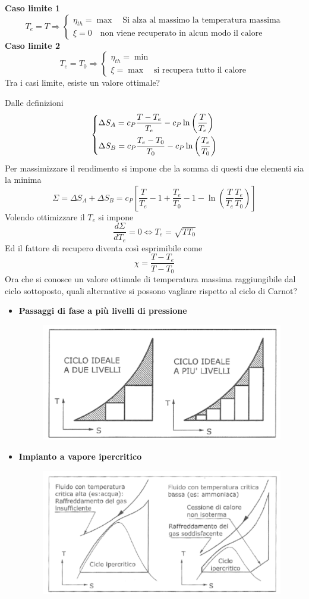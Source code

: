 \begin{adjustwidth}{2in}{}
	\textbf{Caso limite 1}
	\[
		T_e = T \Rightarrow \begin{cases}
			\eta_{th} = \max\quad\text{Si alza al massimo la temperatura massima} \\
			\xi = 0 \quad\text{non viene recuperato in alcun modo il calore}
		\end{cases}
	\]
	\textbf{Caso limite 2}
	\[
	T_e = T_0 \Rightarrow \begin{cases}
		\eta_{th} = \min \\
		\xi = \max \quad\text{si recupera tutto il calore}
	\end{cases}
	\]
	Tra i casi limite, esiste un valore ottimale?
	
	Dalle definizioni 
	\[\begin{dcases}
		\Delta S_A = c_P\dfrac{T-T_e}{T_e} - c_P\ln\left(\dfrac{T}{T_e}\right) \\
		\Delta S_B = c_P\dfrac{T_e-T_0}{T_0} - c_P\ln\left(\dfrac{T_e}{T_0}\right)
	\end{dcases}\]
	Per massimizzare il rendimento si impone che la somma di questi due elementi sia la minima
	\[\Sigma = \Delta S_A + \Delta S_B = c_P\left[\dfrac{T}{T_e} - 1 + \dfrac{T_e}{T_0} - 1 - \ln\left(\dfrac{T}{T_e}\dfrac{T_e}{T_0}\right)\right]\]
	Volendo ottimizzare il $T_e$ si impone 
	\[\dfrac{d\Sigma}{dT_e} = 0 \Leftrightarrow T_e = \sqrt{TT_0}\]
	Ed il fattore di recupero diventa così esprimibile come 
	\[\chi = \dfrac{T-T_e}{T-T_0}\]
	Ora che si conosce un valore ottimale di temperatura massima raggiungibile dal ciclo sottoposto, quali alternative si possono vagliare rispetto al ciclo di Carnot? 
	\begin{itemize}
		\item \textbf{Passaggi di fase a più livelli di pressione}
		\begin{figure}[H]
			\centering
			\includegraphics[width=0.5\linewidth]{immagini/impianticombinati4}
			\label{fig:impianticombinati4}
		\end{figure}
		\item \textbf{Impianto a vapore ipercritico}
		\begin{figure}[H]
			\centering
			\includegraphics[width=0.5\linewidth]{immagini/impianticombinati5}

\end{figure}
\end{itemize}
\end{adjustwidth}
